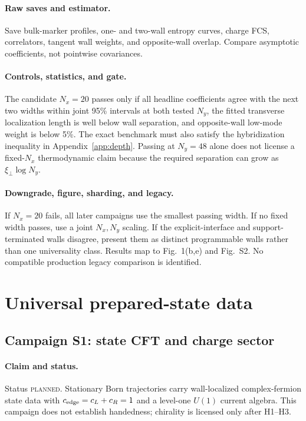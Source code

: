 \documentclass[aps,prx,onecolumn,nofootinbib,superscriptaddress,longbibliography]{revtex4-2}
\newcommand{\planned}{\textsc{planned}}
\begin{document}
\paragraph{Raw saves and estimator.}
Save bulk-marker profiles, one- and two-wall entropy curves, charge FCS, correlators, tangent
wall weights, and opposite-wall overlap.  Compare asymptotic coefficients, not pointwise
covariances.

\paragraph{Controls, statistics, and gate.}
The candidate $N_x=20$ passes only if all headline coefficients agree with the next two
widths within joint 95\% intervals at both tested $N_y$, the fitted transverse localization
length is well below wall separation, and opposite-wall low-mode weight is below 5\%.
The exact benchmark must also satisfy the hybridization inequality in
Appendix~\ref{app:depth}.  Passing at $N_y=48$ alone does not license a fixed-$N_x$
thermodynamic claim because the required separation can grow as $\xi_\perp\log N_y$.

\paragraph{Downgrade, figure, sharding, and legacy.}
If $N_x=20$ fails, all later campaigns use the smallest passing width.  If no fixed width
passes, use a joint $N_x,N_y$ scaling.  If the explicit-interface and support-terminated
walls disagree, present them
as distinct programmable walls rather than one universality class.  Results map to
Fig.~1(b,e) and Fig.~S2.  No compatible production legacy comparison is identified.

\section{Universal prepared-state data}

\subsection{Campaign S1: state CFT and charge sector}
\paragraph{Claim and status.}
Status \planned.  Stationary Born trajectories carry wall-localized complex-fermion state
data with $c_{\rm edge}=c_L+c_R=1$ and a level-one $U(1)$ current algebra.  This campaign
does not establish handedness; chirality is licensed only after H1--H3.
\end{document}
